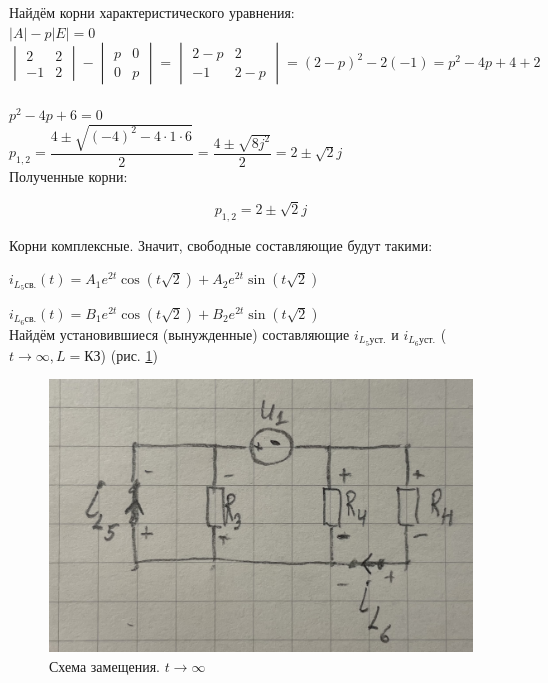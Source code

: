 Найдём корни характеристического уравнения:\\

$ |A| - p|E| = 0 $
\\

$ 
\begin{vmatrix}
2 & 2\\
-1 & 2
\end{vmatrix}
-
\begin{vmatrix}
p & 0\\
0 & p
\end{vmatrix} =
\begin{vmatrix}
2 - p & 2\\
-1 & 2 - p
\end{vmatrix} = 
(2 - p)^2 - 2(-1) = 
p^2 - 4p + 4 + 2
$\\\\

$ p^2 - 4p + 6 = 0 $\\

$ p_{1,2} = 
\dfrac{4 \pm \sqrt{(-4)^2 - 4 \cdot 1 \cdot 6}}{2} = 
\dfrac{4 \pm \sqrt{8j^2}}{2} =
2 \pm \sqrt{2}j
$\\

Полученные корни:

\begin{equation}\label{eq:p_roots}
    p_{1,2} = 2 \pm \sqrt{2}j
\end{equation}

Корни комплексные.
Значит, свободные составляющие
будут такими:

$ i_{L_5 св.}(t) = 
A_1 e^{2t} \cos(t\sqrt{2}) + 
A_2 e^{2t} \sin(t\sqrt{2}) 
$

$ i_{L_6 св.}(t) = 
B_1 e^{2t} \cos(t\sqrt{2}) + 
B_2 e^{2t} \sin(t\sqrt{2}) 
$\\

Найдём установившиеся (вынужденные) составляющие
$ i_{L_5 уст.} $ и $ i_{L_6 уст.} $
($ t \rightarrow \infty, L = КЗ $)
(рис. \ref{fig:circ_replaced_2})

\begin{figure}[H]
    \centering
    \includegraphics[width=0.7\linewidth]{photo/circ_replaced_2}
    \caption{Схема замещения. $ t \rightarrow \infty $}
    \label{fig:circ_replaced_2}
\end{figure}

